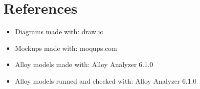 \section{References}

\begin{itemize}
    \item Diagrams made with: draw.io
    \item Mockups made with: moqups.com
    \item Alloy models made with: Alloy Analyzer 6.1.0
    \item Alloy models runned and checked with: Alloy Analyzer 6.1.0
\end{itemize}
